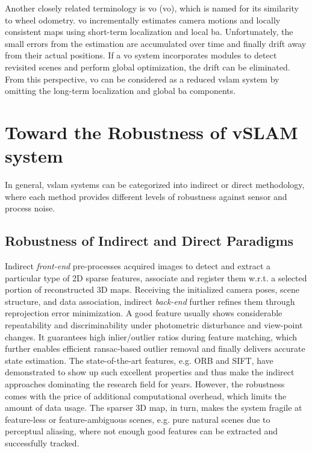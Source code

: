 Another closely related terminology is \acrlong{vo} (\acrshort{vo}), which is named for its similarity to wheel odometry.
\acrshort{vo} incrementally estimates camera motions and locally consistent maps using short-term localization and local \acrshort{ba}. 
Unfortunately, the small errors from the estimation are accumulated over time and finally drift away from their actual positions. 
If a \acrshort{vo} system incorporates modules to detect revisited scenes and perform global optimization, the drift can be eliminated.
From this perspective, \acrshort{vo} can be considered as a reduced \acrshort{vslam} system by omitting the long-term localization and global \acrshort{ba} components.


\section{Toward the Robustness of vSLAM system}
\label{sec:intro_robustness}
In general, \acrshort{vslam} systems can be categorized into indirect or direct methodology, where each method provides different levels of robustness against sensor and process noise.

\subsection{Robustness of Indirect and Direct Paradigms}
Indirect {\em front-end} pre-processes acquired images to detect and extract a particular type of 2D sparse features, associate and register them w.r.t. a selected portion of reconstructed 3D maps.
Receiving the initialized camera poses, scene structure, and data association, indirect {\em back-end} further refines them through reprojection error minimization.
A good feature usually shows considerable repeatability and discriminability under photometric disturbance and view-point changes.
It guarantees high inlier/outlier ratios during feature matching, which further enables efficient \acrshort{ransac}-based outlier removal and finally delivers accurate state estimation. 
The state-of-the-art features, e.g. ORB and SIFT, have demonstrated to show up such excellent properties and thus make the indirect approaches dominating the research field for years. 
However, the robustness comes with the price of additional computational overhead, which limits the amount of data usage. 
The sparser 3D map, in turn, makes the system fragile at feature-less or feature-ambiguous scenes, e.g. pure natural scenes due to perceptual aliasing, where not enough good features can be extracted and successfully tracked. 


